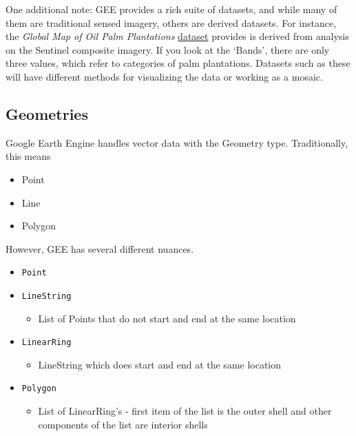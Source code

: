 \documentclass[
]{article}
\providecommand{\tightlist}{%
  \setlength{\itemsep}{0pt}\setlength{\parskip}{0pt}}
\begin{document}
One additional note: GEE provides a rich suite of datasets, and while many of them are traditional sensed imagery, others are derived datasets. For instance, the \emph{Global Map of Oil Palm Plantations} \href{https://developers.google.com/earth-engine/datasets/catalog/BIOPAMA_GlobalOilPalm_v1}{dataset} provides is derived from analysis on the Sentinel composite imagery. If you look at the `Bands', there are only three values, which refer to categories of palm plantations. Datasets such as these will have different methods for visualizing the data or working as a mosaic.

\hypertarget{geometries}{%
\subsection{Geometries}\label{geometries}}

Google Earth Engine handles vector data with the Geometry type. Traditionally, this means

\begin{itemize}
\tightlist
\item
  Point
\item
  Line
\item
  Polygon
\end{itemize}

However, GEE has several different nuances.

\begin{itemize}
\tightlist
\item
  \texttt{Point}
\item
  \texttt{LineString}

  \begin{itemize}
  \tightlist
  \item
    List of Points that do not start and end at the same location
  \end{itemize}
\item
  \texttt{LinearRing}

  \begin{itemize}
  \tightlist
  \item
    LineString which does start and end at the same location
  \end{itemize}
\item
  \texttt{Polygon}

  \begin{itemize}
  \tightlist
  \item
    List of LinearRing's - first item of the list is the outer shell and other components of the list are interior shells
  \end{itemize}
\end{itemize}
\end{document}
